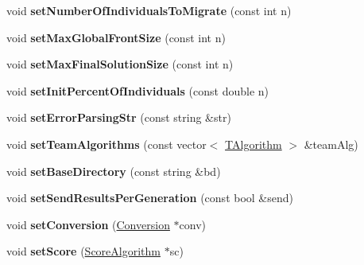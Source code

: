 \begin{DoxyCompactItemize}
\item 
\mbox{\label{classConfiguration_aaab77510b52641b13beeac274e4885b0}} 
void {\bfseries set\+Number\+Of\+Individuals\+To\+Migrate} (const int n)
\item 
\mbox{\label{classConfiguration_a1fd9c286302bdf1fdb5b31906eca2ff5}} 
void {\bfseries set\+Max\+Global\+Front\+Size} (const int n)
\item 
\mbox{\label{classConfiguration_a364114c5358b9a28bfda5fd8da1a6a5f}} 
void {\bfseries set\+Max\+Final\+Solution\+Size} (const int n)
\item 
\mbox{\label{classConfiguration_a1a3802d2be3df9b235e4baefe7c8bd62}} 
void {\bfseries set\+Init\+Percent\+Of\+Individuals} (const double n)
\item 
\mbox{\label{classConfiguration_ae3c02c38464b9becb5a6186ac6c92488}} 
void {\bfseries set\+Error\+Parsing\+Str} (const string \&str)
\item 
\mbox{\label{classConfiguration_a8d3191a828173e67b74a6f5429f3df7e}} 
void {\bfseries set\+Team\+Algorithms} (const vector$<$ \mbox{\hyperlink{structTAlgorithm}{T\+Algorithm}} $>$ \&team\+Alg)
\item 
\mbox{\label{classConfiguration_aea69a96c4abdce71c05b5f088dac83c5}} 
void {\bfseries set\+Base\+Directory} (const string \&bd)
\item 
\mbox{\label{classConfiguration_a307b3b226929a336ac312c32f58317fc}} 
void {\bfseries set\+Send\+Results\+Per\+Generation} (const bool \&send)
\item 
\mbox{\label{classConfiguration_a6798898ae6ae82bfe522b9501daee5c7}} 
void {\bfseries set\+Conversion} (\mbox{\hyperlink{classConversion}{Conversion}} $\ast$conv)
\item 
\mbox{\label{classConfiguration_a785c474d10609a893f9264bc424f2616}} 
void {\bfseries set\+Score} (\mbox{\hyperlink{classScoreAlgorithm}{Score\+Algorithm}} $\ast$sc)
\item 

\end{DoxyCompactItemize}
